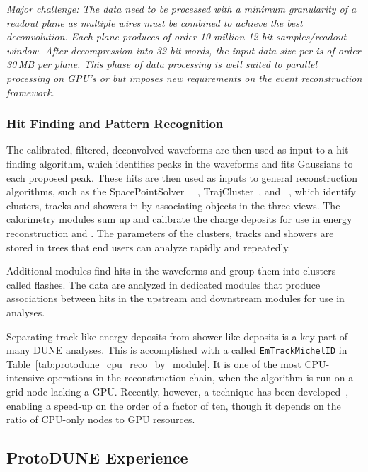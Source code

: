 \documentclass[../main-v1.tex]{subfiles}
\begin{document}
{\it Major challenge: The  data need to be processed with a minimum granularity of a readout plane as multiple wires must be combined to achieve the best \twod deconvolution.  Each plane produces of order 10 million 12-bit samples/readout window. After decompression into 32 bit words, the input data size %
per  is of order 30\,MB per plane. This phase of data processing is well suited to parallel processing on GPU's or  but imposes new requirements on the event reconstruction framework. }

\subsubsection{Hit Finding and Pattern Recognition}

The calibrated, filtered, deconvolved waveforms are then used as input to a hit-finding algorithm, which identifies peaks in the waveforms and fits Gaussians to each proposed peak.  These hits are then used as inputs to general reconstruction algorithms, such as the SpacePointSolver~\cite{DUNE:2020ypp} ~\cite{Marshall:2015rfa}, TrajCluster~\cite{ref:trajcluster}, and ~\cite{ref:PMA}, which identify clusters, tracks and showers in \threed by associating objects in the three \twod views.  The calorimetry modules sum up and calibrate the charge deposits for use in energy reconstruction and .  The parameters of the clusters, tracks and showers are stored in  trees that end users can analyze rapidly and repeatedly.

Additional modules find hits in the  waveforms and group them into clusters called flashes.  The  data are analyzed in dedicated modules that produce associations between hits in the upstream and downstream  modules for use in analyses.

Separating track-like energy deposits from shower-like deposits is a key part of many DUNE analyses.  This is accomplished with a  called {\tt EmTrackMichelID} in Table~\ref{tab:protodune_cpu_reco_by_module}.  It is one of the most CPU-intensive operations in the  reconstruction chain, when the algorithm is run on a grid node lacking a GPU.  Recently, however, a  technique has been developed~\cite{Wang:2020fjr}, enabling a speed-up on the order of a factor of ten, though it depends on the ratio of CPU-only nodes to GPU resources.


\subsection{ProtoDUNE Experience}
\end{document}
